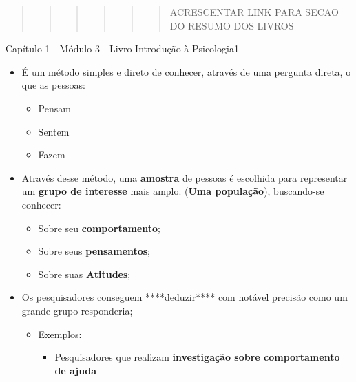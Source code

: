 \documentclass[
]{book}
\providecommand{\tightlist}{%
  \setlength{\itemsep}{0pt}\setlength{\parskip}{0pt}}
\begin{document}
\begin{quote}
\begin{quote}
\begin{quote}
\begin{quote}
\begin{quote}
\begin{quote}
ACRESCENTAR LINK PARA SECAO DO RESUMO DOS LIVROS
\end{quote}
\end{quote}
\end{quote}
\end{quote}
\end{quote}
\end{quote}

Capítulo 1 - Módulo 3 - Livro Introdução à Psicologia1

\begin{itemize}
\tightlist
\item
  É um método simples e direto de conhecer, através de uma pergunta direta, o que as pessoas:

  \begin{itemize}
  \tightlist
  \item
    Pensam
  \item
    Sentem
  \item
    Fazem
  \end{itemize}
\item
  Através desse método, uma \textbf{amostra} de pessoas é escolhida para representar um \textbf{grupo de interesse} mais amplo. (\textbf{Uma população}), buscando-se conhecer:

  \begin{itemize}
  \tightlist
  \item
    Sobre seu \textbf{comportamento};
  \item
    Sobre seus \textbf{pensamentos};
  \item
    Sobre suas \textbf{Atitudes};
  \end{itemize}
\item
  Os pesquisadores conseguem ****deduzir**** com notável precisão como um grande grupo responderia;

  \begin{itemize}
  \tightlist
  \item
    Exemplos:

    \begin{itemize}
    \tightlist
    \item
      Pesquisadores que realizam \textbf{investigação sobre comportamento de ajuda}


\end{itemize}
\end{itemize}
\end{itemize}
\end{document}
